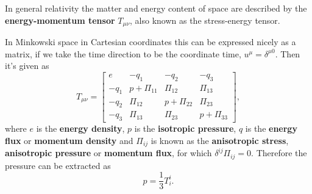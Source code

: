 In general relativity the matter and energy content of space are described by the \textbf{energy-momentum tensor} $T_{\mu \nu}$, also known as the stress-energy tensor.
\iffalse
Without loss of generality it can be decomposed as
\begin{equation}
T_{\mu \nu} = e u_\mu u_\nu + p h_{\mu \nu} + 2 q_{(\mu} u_{\beta)} + \Pi_{\mu \mu},
\end{equation}
where $h_{\mu \nu} = g_{\mu \nu} + u_\alpha u_\beta$ projects orthogonally to the time direction given by $u^\alpha$, $e$ is the \textbf{energy density}, p is the \textbf{pressure}, $q_\alpha$ is the \textbf{energy flux} or \textbf{momentum density}, and $\Pi_{\mu \nu}$ is the \textbf{anisotropic stress} or \textbf{anisotropic pressure}.
\fi
In Minkowski space in Cartesian coordinates this can be expressed nicely as a matrix,
if we take the time direction to be the coordinate time, $u^\mu = \delta^{\mu 0}$.
Then it's given as
\cites[eq. 4.17]{rasanen_gr_2022}[fig. 3.3]{rezzolla_relativistic_2013}
\begin{equation}
T_{\mu \nu} =
\begin{bmatrix}
e & -q_1 & -q_2 & -q_3 \\
-q_1 & p + \Pi_{11} & \Pi_{12} & \Pi_{13} \\
-q_2 & \Pi_{12} & p + \Pi_{22} & \Pi_{23} \\
-q_3 & \Pi_{13} & \Pi_{23} & p + \Pi_{33}
\end{bmatrix},
\label{eq:ep_tensor_general_matrix}
\end{equation}
where $e$ is the \textbf{energy density}, $p$ is the \textbf{isotropic pressure}, $q$ is the \textbf{energy flux} or \textbf{momentum density} and
$\Pi_{ij}$ is known as the \textbf{anisotropic stress}, \textbf{anisotropic pressure} or \textbf{momentum flux},
for which $\delta^{ij} \Pi_{ij} = 0$.
Therefore the pressure can be extracted as
\begin{equation}
p = \frac{1}{3} T^i_i.
\label{eq:pressure_from_ep_tensor}
\end{equation}

